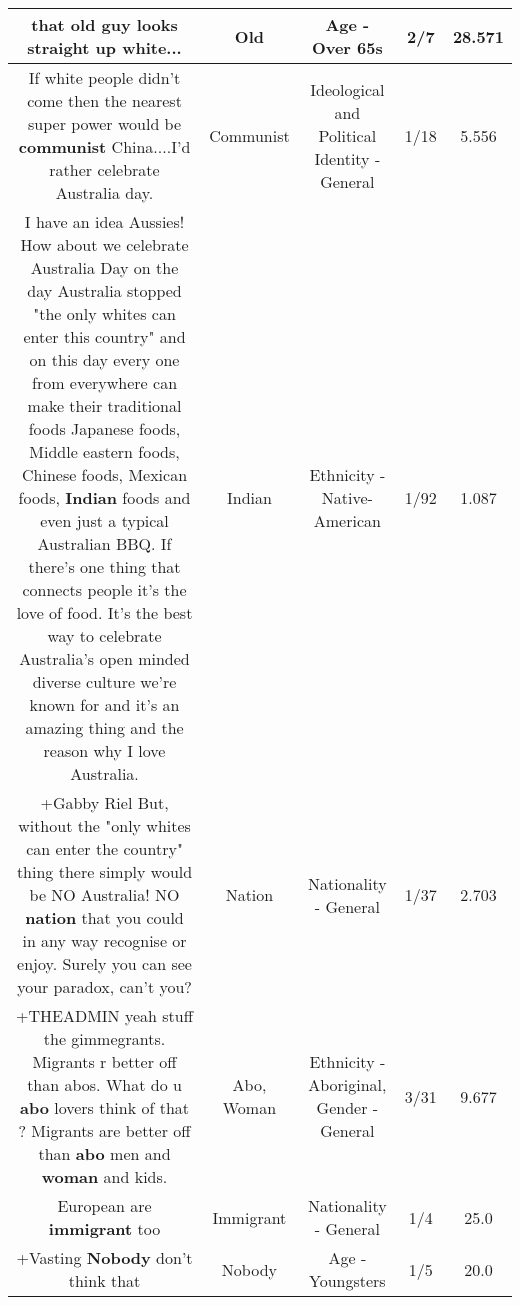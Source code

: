 \documentclass[11pt]{article}
\newlength\mylength
\begin{document}
\begin{center}
\begin{longtable}{|C{.65\mylength}|C{.30\mylength}|C{.12\mylength}|C{.12\mylength}|C{.12\mylength}|}
  \small that \textbf{old} guy looks straight up white...\normalsize   & Old & Age - Over 65s & 2/7 & 28.571 \\  \hline
  \small If white people didn't come then the nearest super power would be \textbf{communist} China....I'd rather celebrate Australia day.\normalsize   & Communist &  Ideological and Political Identity - General & 1/18 & 5.556 \\  \hline
  \small I have an idea Aussies! How about we celebrate Australia Day on the day Australia stopped "the only whites can enter this country" and on this day every one from everywhere can make their traditional foods Japanese foods, Middle eastern foods, Chinese foods, Mexican foods, \textbf{Indian} foods and even just a typical Australian BBQ. If there's one thing that connects people it's the love of food. It's the best way to celebrate Australia's open minded diverse culture we're known for and it's an amazing thing and the reason why I love Australia.\normalsize   & Indian & Ethnicity - Native-American & 1/92 & 1.087 \\  \hline
  \small +Gabby Riel But, without the "only whites can enter the country" thing there simply would be NO Australia! NO \textbf{nation} that you could in any way recognise or enjoy. Surely you can see your paradox, can't you?\normalsize   & Nation & Nationality - General & 1/37 & 2.703 \\  \hline
  \small +THEADMIN yeah stuff the gimmegrants.  Migrants r better off than abos.  What do u \textbf{abo} lovers think of that ?  Migrants are better off than \textbf{abo} men and \textbf{woman} and kids.\normalsize   & Abo, Woman & Ethnicity - Aboriginal, Gender - General & 3/31 & 9.677 \\  \hline
  \small European are \textbf{immigrant} too\normalsize   & Immigrant & Nationality - General & 1/4 & 25.0 \\  \hline
  \small +Vasting \textbf{Nobody} don't think that\normalsize   & Nobody & Age - Youngsters & 1/5 & 20.0 \\  \hline

\end{longtable}
\end{center}
\end{document}
